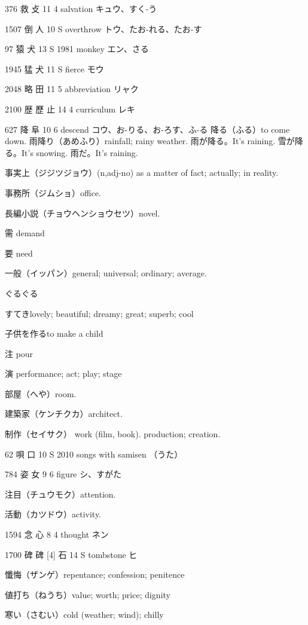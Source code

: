 376	救		攴	11	4		salvation	キュウ、すく-う

1507	倒		人	10	S		overthrow	トウ、たお-れる、たお-す

97	猿		犬	13	S	1981	monkey	エン、さる

1945	猛		犬	11	S		fierce	モウ

2048	略		田	11	5		abbreviation	リャク

2100	歴	歷	止	14	4		curriculum	レキ

627	降		阜	10	6		descend	コウ、お-りる、お-ろす、ふ-る
降る（ふる）to come down.
雨降り（あめふり）rainfall; rainy weather.
雨が降る。It's raining.
雪が降る。It's snowing.
雨だ。It's raining.

事実上（ジジツジョウ）(n,adj-no)
as a matter of fact; actually; in reality.

事務所（ジムショ）office.

長編小説（チョウヘンショウセツ）novel.

需 demand

要 need

一般（イッパン）general; universal; ordinary; average.

ぐるぐる

すてきlovely; beautiful; dreamy; great; superb; cool


子供を作るto make a child

注 pour

演 performance; act; play; stage

部屋（へや）room.

建築家（ケンチクカ）architect.

制作（セイサク）
work (film, book).
production; creation.

62	唄		口	10	S	2010	songs with samisen	（うた）

784	姿		女	9	6		figure	シ、すがた

注目（チュウモク）attention.

活動（カツドウ）activity.

1594	念		心	8	4		thought	ネン

1700	碑	碑 [4]	石	14	S		tombstone	ヒ

懺悔（ザンゲ）repentance; confession; penitence

値打ち（ねうち）value; worth; price; dignity

寒い（さむい）cold (weather; wind); chilly
